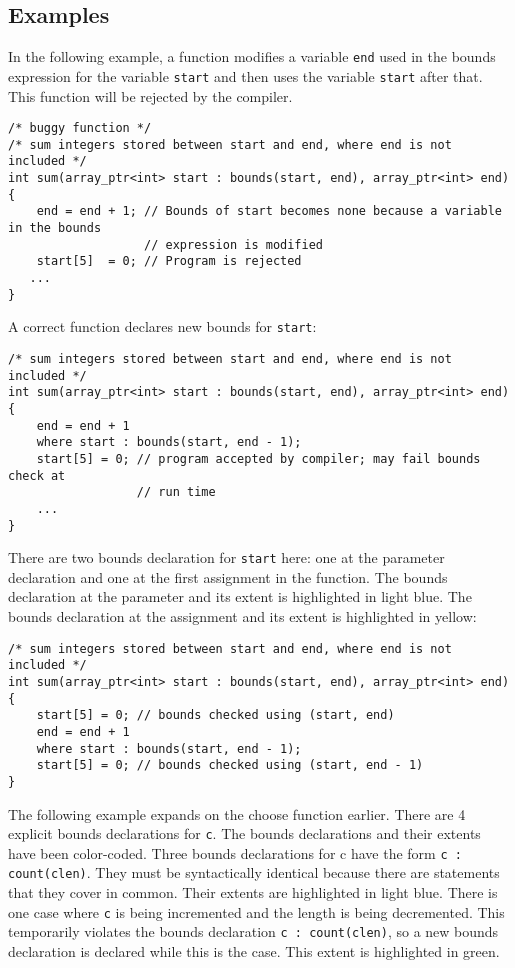 \subsection{Examples}
\label{examples:consistency}

In the following example, a function modifies a variable \texttt{end}
used in the bounds expression for the variable \texttt{start} and then
uses the variable \texttt{start} after that. This function will be
rejected by the compiler.

\begin{verbatim}
/* buggy function */
/* sum integers stored between start and end, where end is not included */
int sum(array_ptr<int> start : bounds(start, end), array_ptr<int> end)
{ 
    end = end + 1; // Bounds of start becomes none because a variable in the bounds
                   // expression is modified
    start[5]  = 0; // Program is rejected
   ...
}
\end{verbatim}

A correct function declares new bounds for \texttt{start}:

\begin{verbatim}
/* sum integers stored between start and end, where end is not included */
int sum(array_ptr<int> start : bounds(start, end), array_ptr<int> end)
{ 
    end = end + 1
    where start : bounds(start, end - 1);
    start[5] = 0; // program accepted by compiler; may fail bounds check at 
                  // run time
    ...
}
\end{verbatim}

There are two bounds declaration for \texttt{start} here: one at the
parameter declaration and one at the first assignment in the function.
The bounds declaration at the parameter and its extent is highlighted in
light blue. The bounds declaration at the assignment and its extent is
highlighted in yellow:

\begin{verbatim}
/* sum integers stored between start and end, where end is not included */
int sum(array_ptr<int> start : bounds(start, end), array_ptr<int> end)
{ 
    start[5] = 0; // bounds checked using (start, end)
    end = end + 1
    where start : bounds(start, end - 1);
    start[5] = 0; // bounds checked using (start, end - 1)
}
\end{verbatim}

The following example expands on the choose function earlier. There are
4 explicit bounds declarations for \texttt{c}. The bounds declarations
and their extents have been color-coded. Three bounds declarations for c
have the form \texttt{c : count(clen)}. They must be syntactically
identical because there are statements that they cover in common. Their
extents are highlighted in light blue. There is one case where
\texttt{c} is being incremented and the length is being decremented.
This temporarily violates the bounds declaration \texttt{c :
count(clen)}, so a new bounds declaration is declared while this is the
case. This extent is highlighted in green.

